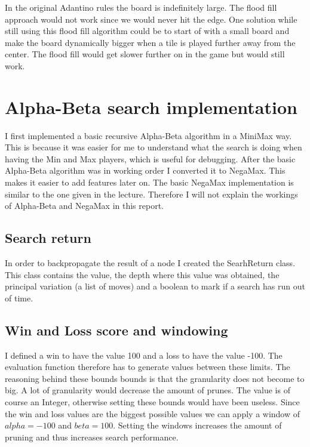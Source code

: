 \documentclass{article}
\begin{document}
In the original Adantino rules the board is indefinitely large. The flood fill approach would not work since we would never hit the edge. One solution while still using this flood fill algorithm could be to start of with a small board and make the board dynamically bigger when a tile is played further away from the center. The flood fill would get slower further on in the game but would still work.





\section{Alpha-Beta search implementation}
I first implemented a basic recursive Alpha-Beta algorithm in a MiniMax way. This is because it was easier for me to understand what the search is doing when having the Min and Max players, which is useful for debugging. After the basic Alpha-Beta algorithm was in working order I converted it to NegaMax. This makes it easier to add features later on. The basic NegaMax implementation is similar to the one given in the lecture. Therefore I will not explain the workings of Alpha-Beta and NegaMax in this report.

\subsection{Search return}
In order to backpropagate the result of a node I created the SearhReturn class. This class contains the value, the depth where this value was obtained, the principal variation (a list of moves) and a boolean to mark if a search has run out of time.

\subsection{Win and Loss score and windowing}
I defined a win to have the value 100 and a loss to have the value -100. The evaluation function therefore has to generate values between these limits. The reasoning behind these bounds bounds is that the granularity does not become to big. A lot of granularity would decrease the amount of prunes. The value is of course an Integer, otherwise setting these bounds would have been useless. Since the win and loss values are the biggest possible values we can apply a window of $alpha = -100$ and $beta = 100$. Setting the windows increases the amount of pruning and thus increases search performance.
\end{document}
